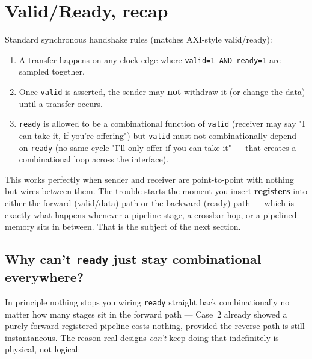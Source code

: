 \documentclass[12pt]{article}
\begin{document}
\section{Valid/Ready, recap}

Standard synchronous handshake rules (matches AXI-style valid/ready):

\begin{enumerate}[leftmargin=1.4em]
  \item A transfer happens on any clock edge where \texttt{valid=1 AND
  ready=1} are sampled together.
  \item Once \texttt{valid} is asserted, the sender may \textbf{not}
  withdraw it (or change the data) until a transfer occurs.
  \item \texttt{ready} is allowed to be a combinational function of
  \texttt{valid} (receiver may say "I can take it, if you're offering") but
  \texttt{valid} must not combinationally depend on \texttt{ready} (no
  same-cycle "I'll only offer if you can take it" — that creates a
  combinational loop across the interface).
\end{enumerate}

This works perfectly when sender and receiver are point-to-point with
nothing but wires between them. The trouble starts the moment you insert
\textbf{registers} into either the forward (valid/data) path or the
backward (ready) path — which is exactly what happens whenever a pipeline
stage, a crossbar hop, or a pipelined memory sits in between. That is the
subject of the next section.

\subsection{Why can't \texttt{ready} just stay combinational everywhere?}

In principle nothing stops you wiring \texttt{ready} straight back
combinationally no matter how many stages sit in the forward path — Case~2
already showed a purely-forward-registered pipeline costs nothing, provided
the reverse path is still instantaneous. The reason real designs
\emph{can't} keep doing that indefinitely is physical, not logical:
\end{document}

